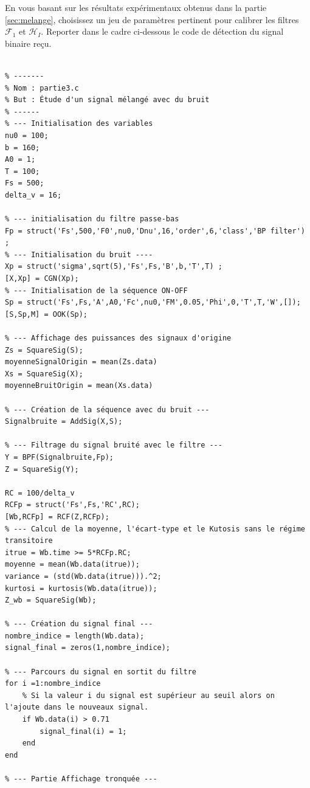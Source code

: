 \documentclass{article}
\begin{document}
En vous basant sur les résultats expérimentaux obtenus dans la partie \ref{sec:melange}, choisissez un jeu de paramètres pertinent pour calibrer les filtres 
$\mathcal{F}_1$ et $\mathcal{H}_I$. Reporter dans le cadre ci-dessous le code  de détection du signal binaire reçu. 

\begin{verbatim}

% -------
% Nom : partie3.c
% But : Étude d'un signal mélangé avec du bruit  
% ------
% --- Initialisation des variables 
nu0 = 100;
b = 160;
A0 = 1;
T = 100;
Fs = 500;
delta_v = 16;

% --- initialisation du filtre passe-bas 
Fp = struct('Fs',500,'F0',nu0,'Dnu',16,'order',6,'class','BP filter') ;
% --- Initialisation du bruit ---- 
Xp = struct('sigma',sqrt(5),'Fs',Fs,'B',b,'T',T) ;
[X,Xp] = CGN(Xp);
% --- Initialisation de la séquence ON-OFF
Sp = struct('Fs',Fs,'A',A0,'Fc',nu0,'FM',0.05,'Phi',0,'T',T,'W',[]);
[S,Sp,M] = OOK(Sp);

% --- Affichage des puissances des signaux d'origine 
Zs = SquareSig(S);
moyenneSignalOrigin = mean(Zs.data)
Xs = SquareSig(X);
moyenneBruitOrigin = mean(Xs.data)

% --- Création de la séquence avec du bruit ---
Signalbruite = AddSig(X,S);

% --- Filtrage du signal bruité avec le filtre ---
Y = BPF(Signalbruite,Fp);
Z = SquareSig(Y);

RC = 100/delta_v
RCFp = struct('Fs',Fs,'RC',RC);
[Wb,RCFp] = RCF(Z,RCFp);
% --- Calcul de la moyenne, l'écart-type et le Kutosis sans le régime transitoire
itrue = Wb.time >= 5*RCFp.RC;
moyenne = mean(Wb.data(itrue));
variance = (std(Wb.data(itrue))).^2;
kurtosi = kurtosis(Wb.data(itrue));
Z_wb = SquareSig(Wb);

% --- Création du signal final --- 
nombre_indice = length(Wb.data);
signal_final = zeros(1,nombre_indice);

% --- Parcours du signal en sortit du filtre 
for i =1:nombre_indice
    % Si la valeur i du signal est supérieur au seuil alors on l'ajoute dans le nouveaux signal.
    if Wb.data(i) > 0.71
        signal_final(i) = 1;
    end 
end

% --- Partie Affichage tronquée ---
\end{verbatim}

\newpage
\subsubsection{}
\end{document}
